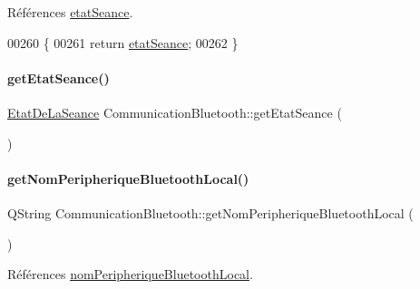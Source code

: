 Références \hyperlink{class_communication_bluetooth_adc66f3034d46f3964a26b62ad98e784f}{etat\+Seance}.


\begin{DoxyCode}
00260 \{
00261     \textcolor{keywordflow}{return} \hyperlink{class_communication_bluetooth_adc66f3034d46f3964a26b62ad98e784f}{etatSeance};
00262 \}
\end{DoxyCode}
\mbox{\label{class_communication_bluetooth_a8e725abd994bd1b47dd373ad19306ac1}} 
\paragraph{\texorpdfstring{get\+Etat\+Seance()}{getEtatSeance()}\hspace{0.1cm}{\footnotesize\ttfamily [2/2]}}
{\footnotesize\ttfamily \hyperlink{class_communication_bluetooth_a414353c68cf4b316937d7c929f20d22a}{Etat\+De\+La\+Seance} Communication\+Bluetooth\+::get\+Etat\+Seance (\begin{DoxyParamCaption}{ }\end{DoxyParamCaption})}

\mbox{\label{class_communication_bluetooth_a20694d5121f78fe4b83b1ef93a2dd5d1}} 
\paragraph{\texorpdfstring{get\+Nom\+Peripherique\+Bluetooth\+Local()}{getNomPeripheriqueBluetoothLocal()}}
{\footnotesize\ttfamily Q\+String Communication\+Bluetooth\+::get\+Nom\+Peripherique\+Bluetooth\+Local (\begin{DoxyParamCaption}{ }\end{DoxyParamCaption})}



Références \hyperlink{class_communication_bluetooth_a6781eed73c4b5db0fe7ff94c034f2cf5}{nom\+Peripherique\+Bluetooth\+Local}.


